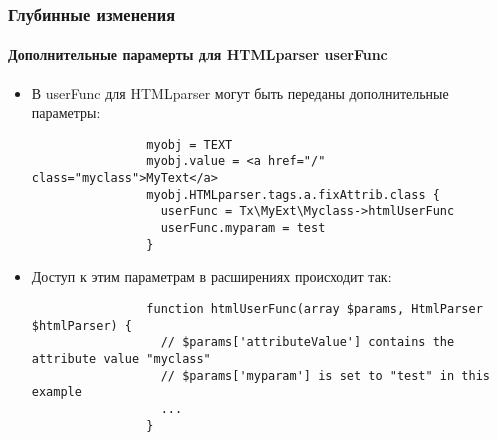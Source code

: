 \begin{frame}[fragile]
	\frametitle{Глубинные изменения}
	\framesubtitle{Дополнительные парамерты для HTMLparser userFunc}

	\lstset{basicstyle=\tiny\ttfamily}

	\begin{itemize}

		\item В userFunc для HTMLparser могут быть переданы дополнительные параметры:

			\begin{lstlisting}
				myobj = TEXT
				myobj.value = <a href="/" class="myclass">MyText</a>
				myobj.HTMLparser.tags.a.fixAttrib.class {
				  userFunc = Tx\MyExt\Myclass->htmlUserFunc
				  userFunc.myparam = test
				}
			\end{lstlisting}

		\item Доступ к этим параметрам в расширениях происходит так:

			\begin{lstlisting}
				function htmlUserFunc(array $params, HtmlParser $htmlParser) {
				  // $params['attributeValue'] contains the attribute value "myclass"
				  // $params['myparam'] is set to "test" in this example
				  ...
				}
			\end{lstlisting}

	\end{itemize}

\end{frame}

